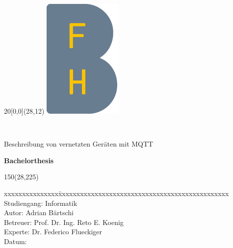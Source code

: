 %
%

\begin{titlepage}



\setlength{\unitlength}{1mm}
\begin{textblock}{20}[0,0](28,12)
	\includegraphics[scale=1.0]{bilder/BFH_Logo_B.png}
\end{textblock}
\color{black}

\begin{flushleft}

\vspace*{21mm}

\fontsize{26pt}{28pt}\selectfont 
\titel 				\\							%
\vspace{2mm}

\fontsize{16pt}{20pt}\selectfont\vspace{0.3em}
Beschreibung von vernetzten Geräten mit MQTT  			\\
\vspace{5mm}

\fontsize{10pt}{12pt}\selectfont
\textbf{Bachelorthesis} \\
\vspace{3mm}



\begin{textblock}{150}(28,225)
\fontsize{10pt}{17pt}\selectfont
\begin{tabbing}
xxxxxxxxxxxxxxx\=xxxxxxxxxxxxxxxxxxxxxxxxxxxxxxxxxxxxxxxxxxxxxxx \kill
Studiengang:	\> Informatik	\\
Autor:		    \> Adrian Bärtschi		\\
Betreuer:		\> Prof. Dr. Ing. Reto E. Koenig		\\
Experte:		\> Dr. Federico Flueckiger				\\
Datum:			\> \versiondate					\\		%
\end{tabbing}


\end{textblock}
\end{flushleft}
\end{titlepage}
